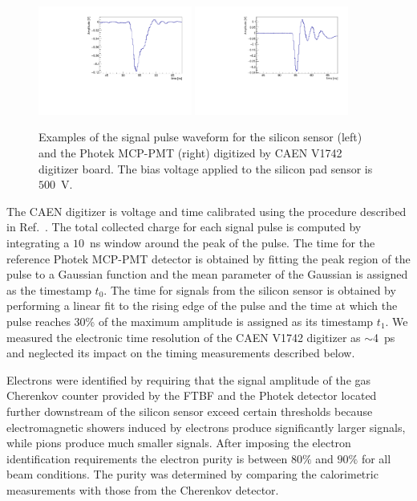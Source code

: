 \begin{figure}[htbp] 
\centering
\includegraphics[width=0.45\textwidth]{plots/ExampleSiliconPadPulse_6X0_16GeV.pdf} 
\includegraphics[width=0.45\textwidth]{plots/ExamplePhotekPulse.pdf} 
\caption{Examples of the signal pulse waveform for the silicon sensor (left) and
the Photek MCP-PMT (right) digitized by CAEN V1742 digitizer board. The bias
voltage applied to the silicon pad sensor is~$500$~V.} 
\label{fig:pulses} 
\end{figure} 

The CAEN digitizer is voltage and time calibrated using the  procedure
described in Ref.~\cite{Kim201467}. The total collected charge for each signal
pulse is computed by integrating a $10$~ns window around the peak of the pulse.
The time for the reference Photek MCP-PMT detector is obtained by fitting the
peak region of the pulse to a Gaussian function and the mean parameter of the
Gaussian is assigned as the timestamp $t_0$. The time for signals from the
silicon sensor is obtained by performing a linear fit to the rising edge of the
pulse and the time at which the pulse reaches 30\% of the maximum amplitude is
assigned as its timestamp $t_1$. We measured the electronic time resolution
of the CAEN V1742 digitizer as $\sim$4~ps and neglected its impact on the timing
measurements described below.

Electrons were identified by requiring that the signal amplitude of the gas Cherenkov counter
provided by the FTBF and the Photek detector located further
downstream of the silicon sensor exceed certain thresholds because electromagnetic showers induced by electrons
produce significantly larger signals, while pions produce much smaller signals. After imposing the electron identification requirements the electron purity is between $80\%$ and $90\%$ for all beam
conditions. The purity was determined by comparing the calorimetric measurements with those 
from the Cherenkov detector.

